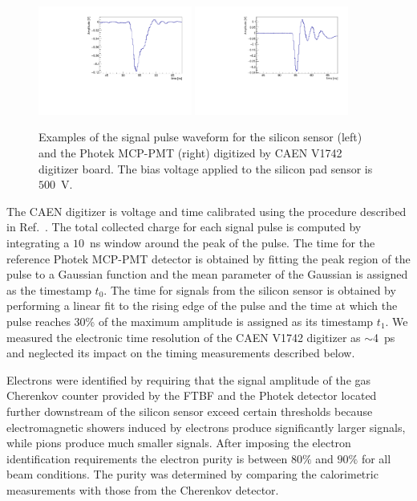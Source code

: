 \begin{figure}[htbp] 
\centering
\includegraphics[width=0.45\textwidth]{plots/ExampleSiliconPadPulse_6X0_16GeV.pdf} 
\includegraphics[width=0.45\textwidth]{plots/ExamplePhotekPulse.pdf} 
\caption{Examples of the signal pulse waveform for the silicon sensor (left) and
the Photek MCP-PMT (right) digitized by CAEN V1742 digitizer board. The bias
voltage applied to the silicon pad sensor is~$500$~V.} 
\label{fig:pulses} 
\end{figure} 

The CAEN digitizer is voltage and time calibrated using the  procedure
described in Ref.~\cite{Kim201467}. The total collected charge for each signal
pulse is computed by integrating a $10$~ns window around the peak of the pulse.
The time for the reference Photek MCP-PMT detector is obtained by fitting the
peak region of the pulse to a Gaussian function and the mean parameter of the
Gaussian is assigned as the timestamp $t_0$. The time for signals from the
silicon sensor is obtained by performing a linear fit to the rising edge of the
pulse and the time at which the pulse reaches 30\% of the maximum amplitude is
assigned as its timestamp $t_1$. We measured the electronic time resolution
of the CAEN V1742 digitizer as $\sim$4~ps and neglected its impact on the timing
measurements described below.

Electrons were identified by requiring that the signal amplitude of the gas Cherenkov counter
provided by the FTBF and the Photek detector located further
downstream of the silicon sensor exceed certain thresholds because electromagnetic showers induced by electrons
produce significantly larger signals, while pions produce much smaller signals. After imposing the electron identification requirements the electron purity is between $80\%$ and $90\%$ for all beam
conditions. The purity was determined by comparing the calorimetric measurements with those 
from the Cherenkov detector.

